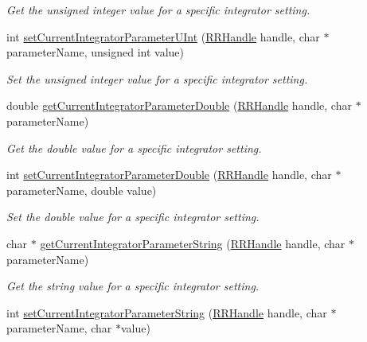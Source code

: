 \begin{DoxyCompactItemize}
\begin{DoxyCompactList}\small\item\em Get the unsigned integer value for a specific integrator setting. \end{DoxyCompactList}\item 
int \hyperlink{group__simopts_gaba7305c74494496bffde25aa431ce638}{set\+Current\+Integrator\+Parameter\+U\+Int} (\hyperlink{rrc__types_8h_a1d68f0592372208fa5a5f2799ea4b3ae}{R\+R\+Handle} handle, char $\ast$parameter\+Name, unsigned int value)
\begin{DoxyCompactList}\small\item\em Set the unsigned integer value for a specific integrator setting. \end{DoxyCompactList}\item 
double \hyperlink{group__simopts_gad859b0cb1724ab3aeee81230c2da272a}{get\+Current\+Integrator\+Parameter\+Double} (\hyperlink{rrc__types_8h_a1d68f0592372208fa5a5f2799ea4b3ae}{R\+R\+Handle} handle, char $\ast$parameter\+Name)
\begin{DoxyCompactList}\small\item\em Get the double value for a specific integrator setting. \end{DoxyCompactList}\item 
int \hyperlink{group__simopts_ga90d69322c437f56d551c14445b57bb5a}{set\+Current\+Integrator\+Parameter\+Double} (\hyperlink{rrc__types_8h_a1d68f0592372208fa5a5f2799ea4b3ae}{R\+R\+Handle} handle, char $\ast$parameter\+Name, double value)
\begin{DoxyCompactList}\small\item\em Set the double value for a specific integrator setting. \end{DoxyCompactList}\item 
char $\ast$ \hyperlink{group__simopts_ga11536f253e0b43f8a282bf3bdfaf1328}{get\+Current\+Integrator\+Parameter\+String} (\hyperlink{rrc__types_8h_a1d68f0592372208fa5a5f2799ea4b3ae}{R\+R\+Handle} handle, char $\ast$parameter\+Name)
\begin{DoxyCompactList}\small\item\em Get the string value for a specific integrator setting. \end{DoxyCompactList}\item 
int \hyperlink{group__simopts_ga7b901ff654788259368fc15c01fe53a6}{set\+Current\+Integrator\+Parameter\+String} (\hyperlink{rrc__types_8h_a1d68f0592372208fa5a5f2799ea4b3ae}{R\+R\+Handle} handle, char $\ast$parameter\+Name, char $\ast$value)

\end{DoxyCompactItemize}
